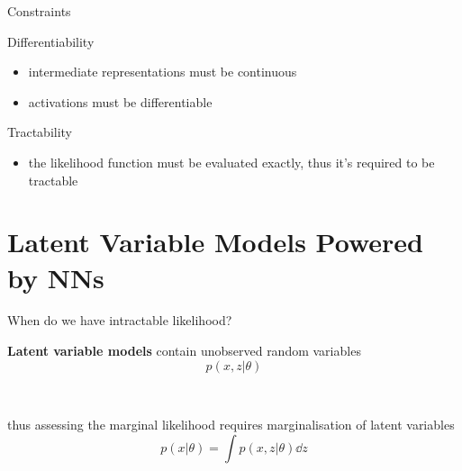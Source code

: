 \begin{frame}{Constraints}

	Differentiability
	\begin{itemize}
		\item intermediate representations must be continuous
		\item activations must be differentiable
	\end{itemize}

	Tractability
	\begin{itemize}
		\item the likelihood function must be evaluated exactly, thus it's required to be tractable
	\end{itemize}



\end{frame}


\section{Latent Variable Models Powered by NNs}
\frame{\tableofcontents[currentsection]}

\begin{frame}{When do we have intractable likelihood?}

{\bf Latent variable models} contain unobserved random variables\\ 
\begin{equation*}
p(x, z|\theta)
\end{equation*}

~ 

thus assessing the marginal likelihood requires \alert{marginalisation of latent variables} 
\begin{equation*}
p(x|\theta) = \int p(x, z|\theta) \dd{z} 
\end{equation*}

\end{frame}





